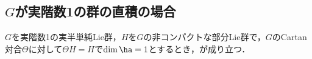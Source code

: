 \subsection{$G$が実階数1の群の直積の場合}

\begin{thm}\label{thm:0113-main}
  $G$を実階数1の実半単純Lie群，$H$を$G$の非コンパクトな部分Lie群で，$G$のCartan対合$\Theta$に対して$\Theta H = H$で$\dim \ha = 1$とするとき，が成り立つ．
\end{thm}


\begin{pfwn}{}

  
  
\end{pfwn}